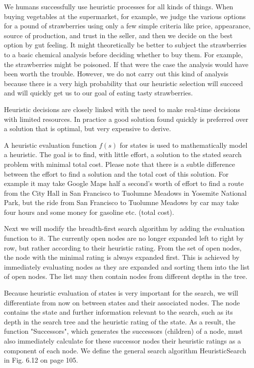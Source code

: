 \documentclass[10pt]{article}
\begin{document}
We humans successfully use heuristic processes for all kinds of things. When buying vegetables at the supermarket, for example, we judge the various options for a pound of strawberries using only a few simple criteria like price, appearance, source of production, and trust in the seller, and then we decide on the best option by gut feeling. It might theoretically be better to subject the strawberries to a basic chemical analysis before deciding whether to buy them. For example, the strawberries might be poisoned. If that were the case the analysis would have been worth the trouble. However, we do not carry out this kind of analysis because there is a very high probability that our heuristic selection will succeed and will quickly get us to our goal of eating tasty strawberries.


Heuristic decisions are closely linked with the need to make real-time decisions with limited resources. In practice a good solution found quickly is preferred over a solution that is optimal, but very expensive to derive.

A heuristic evaluation function $f(s)$ for states is used to mathematically model a heuristic. The goal is to find, with little effort, a solution to the stated search problem with minimal total cost. Please note that there is a subtle difference between the effort to find a solution and the total cost of this solution. For example it may take Google Maps half a second's worth of effort to find a route from the City Hall in San Francisco to Tuolumne Meadows in Yosemite National Park, but the ride from San Francisco to Tuolumne Meadows by car may take four hours and some money for gasoline etc. (total cost).

Next we will modify the breadth-first search algorithm by adding the evaluation function to it. The currently open nodes are no longer expanded left to right by row, but rather according to their heuristic rating. From the set of open nodes, the node with the minimal rating is always expanded first. This is achieved by immediately evaluating nodes as they are expanded and sorting them into the list of open nodes. The list may then contain nodes from different depths in the tree.

Because heuristic evaluation of states is very important for the search, we will differentiate from now on between states and their associated nodes. The node contains the state and further information relevant to the search, such as its depth in the search tree and the heuristic rating of the state. As a result, the function "Successors", which generates the successors (children) of a node, must also immediately calculate for these successor nodes their heuristic ratings as a component of each node. We define the general search algorithm HeuristicSearch in Fig. 6.12 on page 105.
\end{document}
